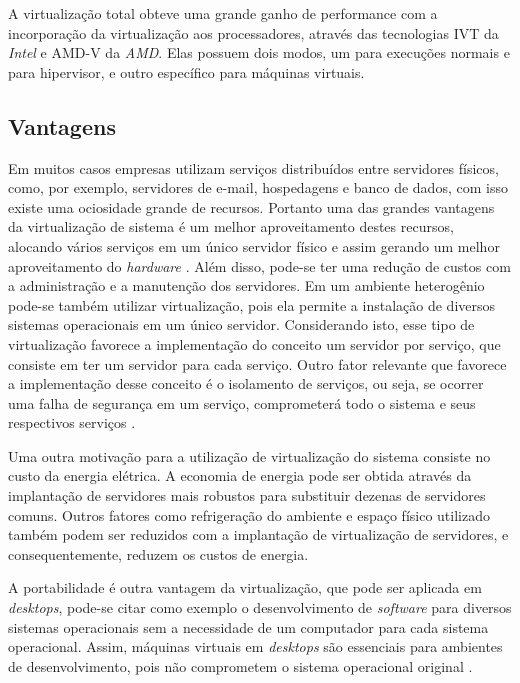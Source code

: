 A virtualização total obteve uma grande ganho de performance com a incorporação da virtualização aos processadores, através das 
tecnologias \ac{IVT} da \textit{Intel} e \ac{AMD-V} da \textit{AMD}. Elas possuem dois modos, um para execuções normais e para hipervisor, 
e outro específico para máquinas virtuais. 

\subsection{Vantagens}
\label{section:virtvantag}

Em muitos casos empresas utilizam serviços distribuídos entre servidores físicos, como, por exemplo, servidores de e-mail, hospedagens e 
banco de dados, com isso existe uma ociosidade grande de recursos. Portanto uma das grandes vantagens da virtualização de sistema é um melhor 
aproveitamento destes recursos, alocando vários serviços em um único servidor físico e assim gerando um melhor aproveitamento do \textit{hardware} 
\cite{moreira2006}. Além disso, pode-se ter uma redução de custos com a administração e a manutenção dos servidores. Em um ambiente 
heterogênio pode-se também utilizar virtualização, pois ela permite a instalação de diversos sistemas operacionais em um único servidor.
Considerando isto, esse tipo de virtualização favorece a implementação do conceito um servidor por serviço, que consiste em ter um servidor
para cada serviço. Outro fator relevante que favorece a implementação desse conceito é o isolamento de serviços, ou seja, se ocorrer
uma falha de segurança em um serviço, comprometerá todo o sistema e seus respectivos serviços \cite{carissimi2008}.

Uma outra motivação para a utilização de virtualização do sistema consiste no custo da energia elétrica. A economia de energia pode ser obtida 
através da implantação de servidores mais robustos para substituir dezenas de servidores comuns. Outros fatores como refrigeração do ambiente e 
espaço físico utilizado também podem ser reduzidos com a implantação de virtualização de servidores, e consequentemente, reduzem os 
custos de energia.

A portabilidade é outra vantagem da virtualização, que pode ser aplicada em \textit{desktops}, pode-se citar como exemplo o desenvolvimento 
de \textit{software} para diversos sistemas operacionais sem a necessidade de um computador para cada sistema operacional. Assim, 
máquinas virtuais em \textit{desktops} são essenciais para ambientes de desenvolvimento, pois não comprometem o sistema operacional
original \cite{carissimi2008}.

